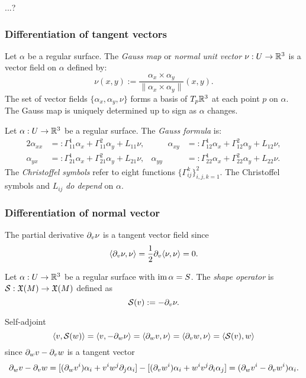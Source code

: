 \documentclass{../exp}
\def\a{\alpha}
\begin{document}
\begin{thm}
...?
\end{thm}


\subsubsection{Differentiation of tangent vectors}

\begin{defn}
Let $\a$ be a regular surface.
The \emph{Gauss map} or \emph{normal unit vector} $\nu:U\to\R^3$ is a vector field on $\a$ defined by:
\[\nu(x,y):=\frac{\a_x\times \a_y}{\|\a_x\times \a_y\|}(x,y).\]
The set of vector fields $\{\a_x,\a_y,\nu\}$ forms a basis of $T_p\mathbb{R}^3$ at each point $p$ on $\a$.
The Gauss map is uniquely determined up to sign as $\a$ changes.
\end{defn}

\begin{defn}
Let $\a:U\to\R^3$ be a regular surface.
The \emph{Gauss formula} is:
\begin{alignat*}{2}
\a_{xx}&=:\Gamma_{11}^1\a_x+\Gamma_{11}^2\a_y+L_{11}\nu,&\qquad
\a_{xy}&=:\Gamma_{12}^1\a_x+\Gamma_{12}^2\a_y+L_{12}\nu,\\
\a_{yx}&=:\Gamma_{21}^1\a_x+\Gamma_{21}^2\a_y+L_{21}\nu,&
\a_{yy}&=:\Gamma_{22}^1\a_x+\Gamma_{22}^2\a_y+L_{22}\nu.
\end{alignat*}
The \emph{Christoffel symbols} refer to eight functions $\{\Gamma_{ij}^k\}_{i,j,k=1}^2$.
The Christoffel symbols and $L_{ij}$ \emph{do depend} on $\a$.
\end{defn}




\subsubsection{Differentiation of normal vector}
The partial derivative $\pd_v\nu$ is a tangent vector field since
\[\<\pd_v\nu,\nu\>=\frac12\pd_v\<\nu,\nu\>=0.\]

\begin{defn}
Let $\a:U\to\R^3$ be a regular surface with $\im\a=S$.
The \emph{shape operator} is $\cS:\fX(M)\to\fX(M)$ defined as
\[\cS(v):=-\pd_v\nu.\]
\end{defn}

Self-adjoint
\[\<v,\cS(w)\>=\<v,-\pd_w\nu\>=\<\pd_wv,\nu\>=\<\pd_vw,\nu\>=\<\cS(v),w\>\]
since $\pd_wv-\pd_vw$ is a tangent vector
\[\pd_wv-\pd_vw=[(\pd_wv^i)\a_i+v^iw^j\pd_j\a_i]-[(\pd_vw^i)\a_i+w^iv^j\pd_i\a_j]=(\pd_wv^i-\pd_vw^i)\a_i.\]
\end{document}

